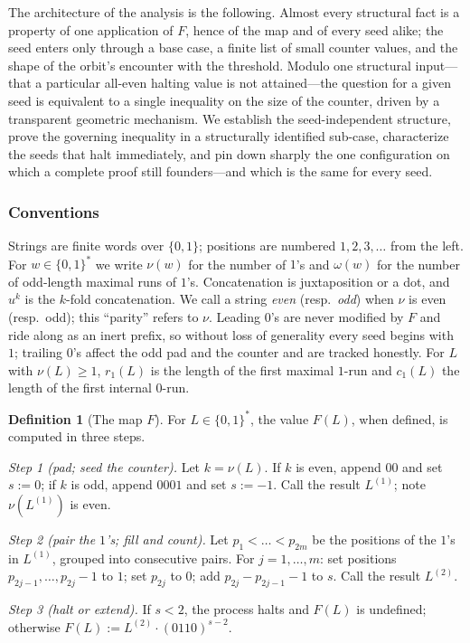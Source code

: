 \documentclass[a4paper]{article}
\theoremstyle{plain}
\theoremstyle{definition}
\newtheorem{definition}{Definition}[subsection]
\theoremstyle{remark}
\begin{document}
The architecture of the analysis is the following. Almost every structural fact is a property of one application of $F$, hence of the map and of every seed alike; the seed enters only through a base case, a finite list of small counter values, and the shape of the orbit's encounter with the threshold. Modulo one structural input---that a particular all-even halting value is not attained---the question for a given seed is equivalent to a single inequality on the size of the counter, driven by a transparent geometric mechanism. We establish the seed-independent structure, prove the governing inequality in a structurally identified sub-case, characterize the seeds that halt immediately, and pin down sharply the one configuration on which a complete proof still founders---and which is the same for every seed.

\subsubsection*{Conventions} Strings are finite words over $\{0,1\}$; positions are numbered $1,2,3,\dots$ from the left. For $w\in\{0,1\}^*$ we write $\nu(w)$ for the number of $1$'s and $\omega(w)$ for the number of odd-length maximal runs of $1$'s. Concatenation is juxtaposition or a dot, and $u^k$ is the $k$-fold concatenation. We call a string \emph{even} (resp.\ \emph{odd}) when $\nu$ is even (resp.\ odd); this ``parity'' refers to $\nu$. Leading $0$'s are never modified by $F$ and ride along as an inert prefix, so without loss of generality every seed begins with $1$; trailing $0$'s affect the odd pad and the counter and are tracked honestly. For $L$ with $\nu(L)\ge 1$, $r_1(L)$ is the length of the first maximal $1$-run and $c_1(L)$ the length of the first internal $0$-run.

\begin{definition}[The map $F$]\label{b2:def:F}
For $L\in\{0,1\}^*$, the value $F(L)$, when defined, is computed in three steps.

\emph{Step 1 (pad; seed the counter).} Let $k=\nu(L)$. If $k$ is even, append $00$ and set $s:=0$; if $k$ is odd, append $0001$ and set $s:=-1$. Call the result $L^{(1)}$; note $\nu(L^{(1)})$ is even.

\emph{Step 2 (pair the $1$'s; fill and count).} Let $p_1<\dots<p_{2m}$ be the positions of the $1$'s in $L^{(1)}$, grouped into consecutive pairs. For $j=1,\dots,m$: set positions $p_{2j-1},\dots,p_{2j}-1$ to $1$; set $p_{2j}$ to $0$; add $p_{2j}-p_{2j-1}-1$ to $s$. Call the result $L^{(2)}$.

\emph{Step 3 (halt or extend).} If $s<2$, the process halts and $F(L)$ is undefined; otherwise $F(L):=L^{(2)}\cdot(0110)^{s-2}$.
\end{definition}
\end{document}
